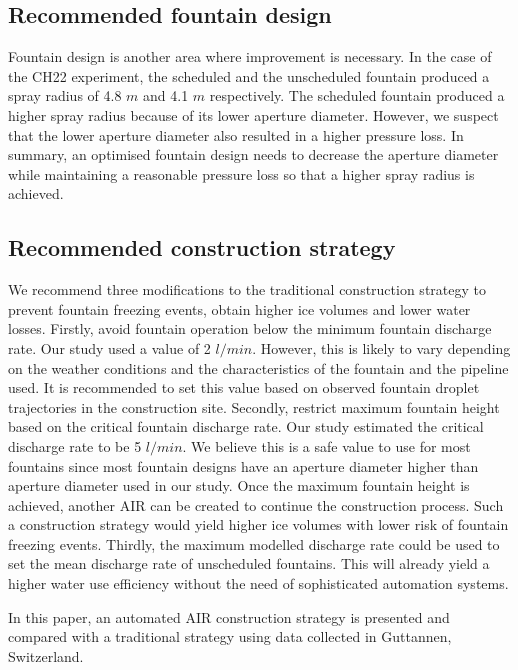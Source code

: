 \documentclass[tc, manuscript]{copernicus}
\begin{document}
\subsection{Recommended fountain design}

Fountain design is another area where improvement is necessary. In the case of the CH22 experiment, the
scheduled and the unscheduled fountain produced a spray radius of 4.8 $m$ and 4.1 $m$ respectively. The
scheduled fountain produced a higher spray radius because of its lower aperture diameter. However, we suspect
that the lower aperture diameter also resulted in a higher pressure loss. In summary, an optimised fountain
design needs to decrease the aperture diameter while maintaining a reasonable pressure loss so that a higher
spray radius is achieved. 

\subsection{Recommended construction strategy}

We recommend three modifications to the traditional construction strategy to prevent fountain freezing events,
obtain higher ice volumes and lower water losses. Firstly, avoid fountain operation below the minimum fountain
discharge rate. Our study used a value of 2 $l/min$. However, this is likely to vary depending on the weather
conditions and the characteristics of the fountain and the pipeline used. It is recommended to set this value
based on observed fountain droplet trajectories in the construction site. Secondly, restrict maximum fountain
height based on the critical fountain discharge rate. Our study estimated the critical discharge rate to be 5
$l/min$. We believe this is a safe value to use for most fountains since most fountain designs have an aperture
diameter higher than aperture diameter used in our study. Once the maximum fountain height is achieved, another
AIR can be created to continue the construction process. Such a construction strategy would yield higher ice
volumes with lower risk of fountain freezing events. Thirdly, the maximum modelled discharge rate could be used
to set the mean discharge rate of unscheduled fountains. This will already yield a higher water use efficiency
without the need of sophisticated automation systems.

\conclusions

In this paper, an automated AIR construction strategy is presented and compared with a traditional strategy
using data collected in Guttannen, Switzerland.
\end{document}
